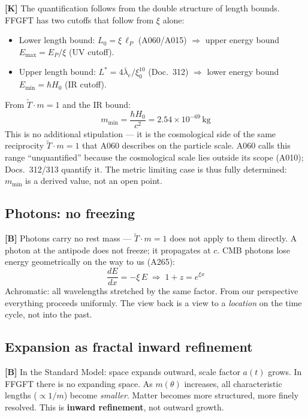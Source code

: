 \textbf{[K]} The quantification follows from the double structure of length bounds.
FFGFT has two cutoffs that follow from $\xi$ alone:
\begin{itemize}[leftmargin=1.4em,itemsep=0.1em]
  \item Lower length bound: $L_0 = \xi\,\ell_P$ (A060/A015)
        $\Rightarrow$ upper energy bound $E_\text{max} = E_P/\xi$
        (UV cutoff).
  \item Upper length bound: $L^* = 4\bar\lambda_e/\xi_0^{10}$ (Doc.~312)
        $\Rightarrow$ lower energy bound $E_\text{min} = \hbar H_0$
        (IR cutoff).
\end{itemize}
From $\tilde{T} \cdot m = 1$ and the IR bound:
\[
  m_\text{min} = \frac{\hbar H_0}{c^2} = 2{.}54\times10^{-69}\,\text{kg}
\]
This is no additional stipulation --- it is the cosmological side of the
same reciprocity $\tilde{T} \cdot m = 1$ that A060 describes on the particle
scale. A060 calls this range \enquote{unquantified} because the cosmological
scale lies outside its scope (A010); Docs.~312/313 quantify it. The metric
limiting case is thus fully determined: $m_\text{min}$ is a derived value,
not an open point.

\subsection{Photons: no freezing}

\textbf{[B]} Photons carry no rest mass --- $\tilde{T} \cdot m = 1$
does not apply to them directly. A photon at the antipode does not
freeze; it propagates at $c$. CMB photons lose energy geometrically
on the way to us (A265):
\[
  \frac{dE}{dx} = -\xi\,E
  \;\Rightarrow\;
  1 + z = e^{\xi x}
\]
Achromatic: all wavelengths stretched by the same factor.
From our perspective everything proceeds uniformly. The view back
is a view to a \emph{location} on the time cycle, not into the past.

\subsection{Expansion as fractal inward refinement}

\textbf{[B]} In the Standard Model: space expands outward, scale
factor $a(t)$ grows. In FFGFT there is no expanding space. As
$m(\theta)$ increases, all characteristic lengths ($\propto 1/m$)
become \emph{smaller}. Matter becomes more structured, more finely
resolved. This is \textbf{inward refinement}, not outward growth.

